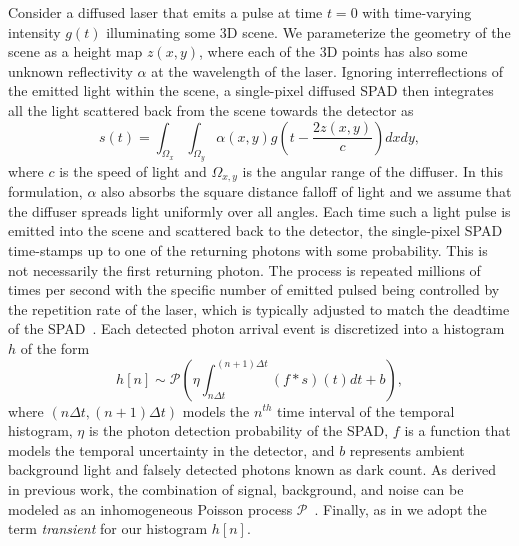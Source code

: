 Consider a diffused laser that emits a pulse at time $t = 0$ with time-varying intensity $g(t)$ illuminating some 3D scene. We parameterize the geometry of the scene as a height map $z(x, y)$, where each of the 3D points has also some unknown reflectivity $\alpha$ at the wavelength of the laser. Ignoring interreflections of the emitted light within the scene, a single-pixel diffused SPAD then integrates all the light scattered back from the scene towards the detector as
%
\begin{equation}
	s \left( t \right)= \int_{\Omega_x} \int_{\Omega_y} \alpha \left( x,y \right) g \left( t - \frac{2z(x,y)}{c} \right) dx dy ,
	\label{eq:pulse_integral} 
\end{equation}  
%
where $c$ is the speed of light and $\Omega_{x,y}$ is the angular range of the diffuser. In this formulation, $\alpha$ also absorbs the square distance falloff of light and we assume that the diffuser spreads light uniformly over all angles. Each time such a light pulse is emitted into the scene and scattered back to the detector, the single-pixel SPAD time-stamps up to one of the returning photons with some probability. This is not necessarily the first returning photon. The process is repeated millions of times per second with the specific number of emitted pulsed being controlled by the repetition rate of the laser, which is typically adjusted to match the deadtime of the SPAD~\cite{Heide:2018}. Each detected photon arrival event is discretized into a histogram $h$ of the form
%
\begin{equation}
  h[n] \sim \mathcal{P} \left( \eta \int_{n\Delta t}^{(n+1)\Delta t} \left(f * s \right) \left( t \right)  dt + b \right),	
	\label{eq:spad_measurements}
\end{equation}
%
where $(n\Delta t, (n+1) \Delta t)$ models the $n^{th}$ time interval of the
temporal histogram, $\eta$ is the photon detection probability of the SPAD, $f$
is a function that models the temporal uncertainty in the detector, and $b$
represents ambient background light and falsely detected photons known as dark
count. As derived in previous work, the combination of signal, background, and
noise can be modeled as an inhomogeneous Poisson process
$\mathcal{P}$~\cite{Kirmani:2014,Shin2015}. Finally, as in \cite{Xin2019} we adopt the term
\textit{transient} for our histogram $h[n]$.

